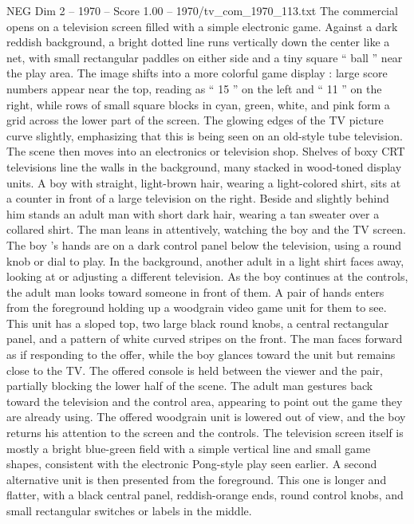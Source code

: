 \begin{textsample}{NEG Dim 2 – 1970 – Score 1.00 – 1970/tv\_com\_1970\_113.txt}  \label{ex:f2_neg_028}
The commercial opens on a television screen filled with a simple electronic game.
Against a dark reddish background, a bright dotted line runs vertically down the center like a net, with small rectangular paddles on either side and a tiny square “ ball ” near the play area.
The image shifts into a more colorful game display : large score numbers appear near the top, reading as “ 15 ” on the left and “ 11 ” on the right, while rows of small square blocks in cyan, green, white, and pink form a grid across the lower part of the screen.
The glowing edges of the TV picture curve slightly, emphasizing that this is being seen on an old-style tube television.
The scene then moves into an electronics or television shop.
Shelves of boxy CRT televisions line the walls in the background, many stacked in wood-toned display units.
A boy with straight, light-brown hair, wearing a light-colored shirt, sits at a counter in front of a large television on the right.
Beside and slightly behind him stands an adult man with short dark hair, wearing a tan sweater over a collared shirt.
The man leans in attentively, watching the boy and the TV screen.
The boy ’s hands are on a dark control panel below the television, using a round knob or dial to play.
In the background, another adult in a light shirt faces away, looking at or adjusting a different television.
As the boy continues at the controls, the adult man looks toward someone in front of them.
A pair of hands enters from the foreground holding up a woodgrain video game unit for them to see.
This unit has a sloped top, two large black round knobs, a central rectangular panel, and a pattern of white curved stripes on the front.
The man faces forward as if responding to the offer, while the boy glances toward the unit but remains close to the TV.
The offered console is held between the viewer and the pair, partially blocking the lower half of the scene.
The adult man gestures back toward the television and the control area, appearing to point out the game they are already using.
The offered woodgrain unit is lowered out of view, and the boy returns his attention to the screen and the controls.
The television screen itself is mostly a bright blue-green field with a simple vertical line and small game shapes, consistent with the electronic Pong-style play seen earlier.
A second alternative unit is then presented from the foreground.
This one is longer and flatter, with a black central panel, reddish-orange ends, round control knobs, and small rectangular switches or labels in the middle.

\end{textsample}
